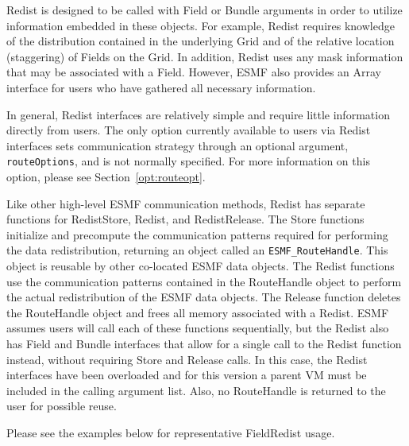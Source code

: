 Redist is designed to be called with Field or Bundle arguments in order to
utilize information embedded in these objects.  For example, Redist requires
knowledge of the distribution contained in the underlying Grid and of the
relative location (staggering) of Fields on the Grid.  In addition, Redist uses
any mask information that may be associated with a Field.  However, ESMF also
provides an Array interface for users who have gathered all necessary
information.

In general, Redist interfaces are relatively simple and require little
information directly from users.  The only option currently available to users
via Redist interfaces sets communication strategy through an optional argument,
{\tt routeOptions}, and is not normally specified.  For more information on
this option, please see Section~\ref{opt:routeopt}.

Like other high-level ESMF communication methods, Redist has separate
functions for RedistStore, Redist, and RedistRelease.  The Store functions
initialize and precompute the communication patterns required for performing
the data redistribution, returning an object called an {\tt ESMF\_RouteHandle}.
This object is reusable by other co-located ESMF data objects.
The Redist functions use the communication patterns contained in the RouteHandle
object to perform the actual redistribution of the ESMF data objects.  The
Release function deletes the RouteHandle object and frees all memory associated
with a Redist.  ESMF assumes users will call each of these functions
sequentially, but the Redist also has Field and Bundle interfaces that allow for
a single call to the Redist function instead, without requiring Store and
Release calls.  In this case, the Redist interfaces have been overloaded and
for this version a parent VM must be included in the calling argument list.
Also, no RouteHandle is returned to the user for possible reuse.

Please see the examples below for representative FieldRedist usage.



